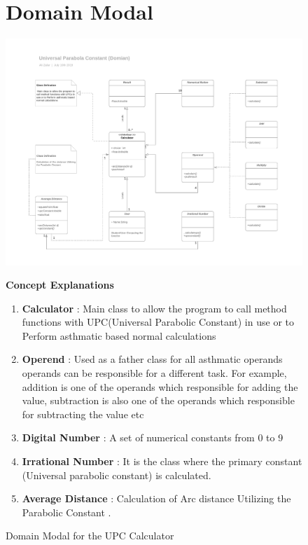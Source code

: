 \documentclass[12pt]{report}
\begin{document}
 \begin{figure}
 \section{Domain Modal}
     \centering
     \includegraphics[width=\textwidth]{Assets/Domain.png}
     \caption{Domain Modal for the UPC Calculator}
     \label{fig:my_label}
     \hfill\newline
     \textbf{Concept Explanations }\hfill\break\\
     \begin{enumerate}
        
         \item \textbf{Calculator} : Main class  to allow the program to  call method functions with UPC(Universal Parabolic Constant) in use  or to Perform asthmatic based normal calculations  
         \item \textbf{Operend} : Used as a father class for all asthmatic operands operands can be responsible for a different task. For example, addition is one of the operands which responsible for adding the value, subtraction is also one of the operands which responsible for subtracting the value etc
         \item \textbf{Digital Number} : A set of numerical constants from 0 to 9
         \item \textbf{Irrational Number} : It is the class where the primary constant (Universal parabolic constant) is calculated. 
         \item \textbf{Average Distance} : Calculation of Arc distance Utilizing the Parabolic Constant .
         
     \end{enumerate}
 \end{figure}
 
\end{document}
